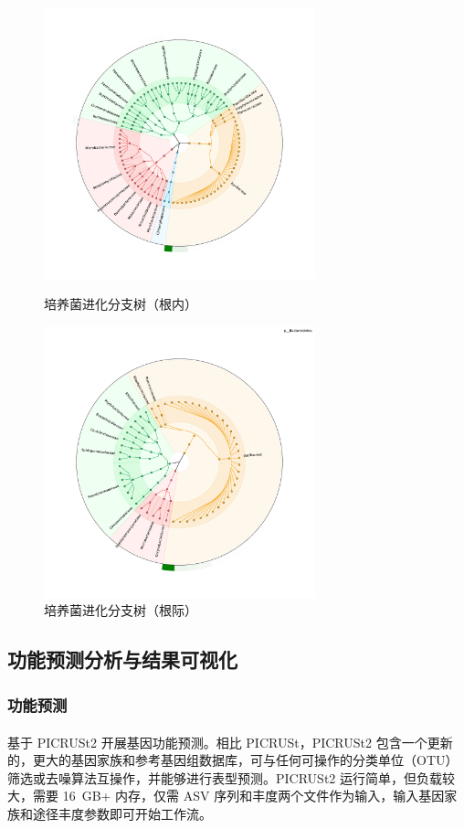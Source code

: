\documentclass[UTF8]{ctexart}
\begin{document}
    \begin{figure}[!htbp]
        \centering
        \includegraphics*[width=0.7\textwidth]{img/en_graphlan.pdf}
        \caption{培养菌进化分支树（根内）}

        \includegraphics*[width=0.7\textwidth]{img/rhi_graphlan.pdf}
        \caption{培养菌进化分支树（根际）}
    \end{figure}

  
    \subsection{功能预测分析与结果可视化}
    \subsubsection{功能预测}
    基于 PICRUSt2 \textsuperscript{\cite{ref7}}开展基因功能预测。相比 PICRUSt，PICRUSt2 包含一个更新的，更大的基因家族和参考基因组数据库，可与任何可操作的分类单位（OTU）筛选或去噪算法互操作，并能够进行表型预测。PICRUSt2 运行简单，但负载较大，需要 16~GB+ 内存，仅需 ASV 序列和丰度两个文件作为输入，输入基因家族和途径丰度参数即可开始工作流。
\end{document}

